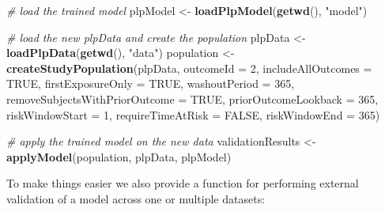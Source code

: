 \documentclass[]{article}
\newenvironment{Shaded}{\begin{snugshade}}{\end{snugshade}}
\newcommand{\KeywordTok}[1]{\textcolor[rgb]{0.13,0.29,0.53}{\textbf{#1}}}
\newcommand{\DataTypeTok}[1]{\textcolor[rgb]{0.13,0.29,0.53}{#1}}
\newcommand{\DecValTok}[1]{\textcolor[rgb]{0.00,0.00,0.81}{#1}}
\newcommand{\StringTok}[1]{\textcolor[rgb]{0.31,0.60,0.02}{#1}}
\newcommand{\CommentTok}[1]{\textcolor[rgb]{0.56,0.35,0.01}{\textit{#1}}}
\newcommand{\OtherTok}[1]{\textcolor[rgb]{0.56,0.35,0.01}{#1}}
\newcommand{\NormalTok}[1]{#1}
\begin{document}
\begin{Shaded}
\begin{Highlighting}[]
\CommentTok{# load the trained model}
\NormalTok{plpModel <-}\StringTok{ }\KeywordTok{loadPlpModel}\NormalTok{(}\KeywordTok{getwd}\NormalTok{(), }\StringTok{"model"}\NormalTok{)}

\CommentTok{# load the new plpData and create the population}
\NormalTok{plpData <-}\StringTok{ }\KeywordTok{loadPlpData}\NormalTok{(}\KeywordTok{getwd}\NormalTok{(), }\StringTok{"data"}\NormalTok{)}
\NormalTok{population <-}\StringTok{ }\KeywordTok{createStudyPopulation}\NormalTok{(plpData, }\DataTypeTok{outcomeId =} \DecValTok{2}\NormalTok{, }\DataTypeTok{includeAllOutcomes =} \OtherTok{TRUE}\NormalTok{, }
    \DataTypeTok{firstExposureOnly =} \OtherTok{TRUE}\NormalTok{, }\DataTypeTok{washoutPeriod =} \DecValTok{365}\NormalTok{, }\DataTypeTok{removeSubjectsWithPriorOutcome =} \OtherTok{TRUE}\NormalTok{, }
    \DataTypeTok{priorOutcomeLookback =} \DecValTok{365}\NormalTok{, }\DataTypeTok{riskWindowStart =} \DecValTok{1}\NormalTok{, }\DataTypeTok{requireTimeAtRisk =} \OtherTok{FALSE}\NormalTok{, }
    \DataTypeTok{riskWindowEnd =} \DecValTok{365}\NormalTok{)}

\CommentTok{# apply the trained model on the new data}
\NormalTok{validationResults <-}\StringTok{ }\KeywordTok{applyModel}\NormalTok{(population, plpData, plpModel)}
\end{Highlighting}
\end{Shaded}

To make things easier we also provide a function for performing external
validation of a model across one or multiple datasets:
\end{document}
